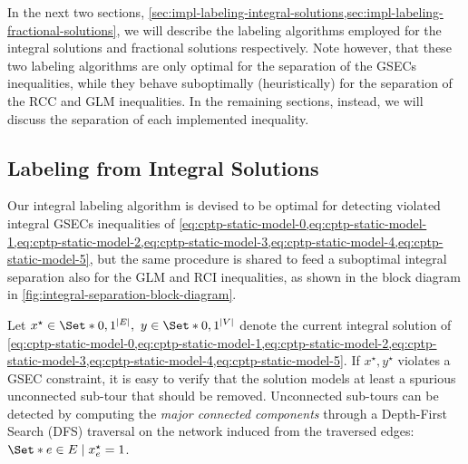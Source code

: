 \medskip

In the next two sections, \cref{sec:impl-labeling-integral-solutions,sec:impl-labeling-fractional-solutions},
we will describe the labeling algorithms employed for the integral solutions
and fractional solutions respectively.
Note however, that these two labeling algorithms
are only optimal for the separation of the GSECs inequalities,
while they behave suboptimally (heuristically) for the separation of the RCC and GLM inequalities.
In the remaining sections, instead,
we will discuss the separation of each implemented inequality.

\subsection{Labeling from Integral Solutions}
\label{sec:impl-labeling-integral-solutions}

Our integral labeling algorithm
is devised to be optimal for detecting violated integral GSECs inequalities
of \cref{eq:cptp-static-model-0,eq:cptp-static-model-1,eq:cptp-static-model-2,eq:cptp-static-model-3,eq:cptp-static-model-4,eq:cptp-static-model-5},
but the same procedure is shared
to feed a suboptimal integral separation also for the GLM and RCI inequalities,
as shown in the block diagram in \cref{fig:integral-separation-block-diagram}.

Let $x^\star \in \Set*{0, 1}^{|E|},\ y \in \Set*{0, 1}^{|V|}$ denote the
current integral solution of
\cref{eq:cptp-static-model-0,eq:cptp-static-model-1,eq:cptp-static-model-2,eq:cptp-static-model-3,eq:cptp-static-model-4,eq:cptp-static-model-5}.
If $x^\star, y^\star$ violates a GSEC constraint,
it is easy to verify that the solution models at least a spurious unconnected sub-tour that should be removed.
Unconnected sub-tours can be detected
by computing the \textit{major connected components}
through a Depth-First Search (DFS) traversal
on the network induced from the traversed edges:  $\Set*{e \in E \mid x^\star_e = 1}$.

\medskip

